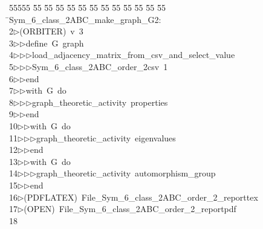 %
%
\begin{tabbing}
55555 \= 55 \= 55 \= 55 \= 55 \= 55 \= 55 \= 55 \= 55 \= 55 \= 55 \= 55 \= 55 \= \>Sym\_6\_class\_2ABC\_make\_graph\_G2:\\[0pt]
2\>$\triangleright$\>(ORBITER)\ v\ 3\ \\[0pt]
3\>$\triangleright$\>$\triangleright$\>define\ G\ graph\ \\[0pt]
4\>$\triangleright$\>$\triangleright$\>$\triangleright$\>load\_adjacency\_matrix\_from\_csv\_and\_select\_value\ \\[0pt]
5\>$\triangleright$\>$\triangleright$\>$\triangleright$\>Sym\_6\_class\_2ABC\_order\_2csv\ 1\ \\[0pt]
6\>$\triangleright$\>$\triangleright$\>end\ \\[0pt]
7\>$\triangleright$\>$\triangleright$\>with\ G\ do\ \\[0pt]
8\>$\triangleright$\>$\triangleright$\>$\triangleright$\>graph\_theoretic\_activity\ properties\ \\[0pt]
9\>$\triangleright$\>$\triangleright$\>end\ \\[0pt]
10\>$\triangleright$\>$\triangleright$\>with\ G\ do\ \\[0pt]
11\>$\triangleright$\>$\triangleright$\>$\triangleright$\>graph\_theoretic\_activity\ eigenvalues\ \\[0pt]
12\>$\triangleright$\>$\triangleright$\>end\ \\[0pt]
13\>$\triangleright$\>$\triangleright$\>with\ G\ do\ \\[0pt]
14\>$\triangleright$\>$\triangleright$\>$\triangleright$\>graph\_theoretic\_activity\ automorphism\_group\ \\[0pt]
15\>$\triangleright$\>$\triangleright$\>end\\[0pt]
16\>$\triangleright$\>(PDFLATEX)\ File\_Sym\_6\_class\_2ABC\_order\_2\_reporttex\\[0pt]
17\>$\triangleright$\>(OPEN)\ File\_Sym\_6\_class\_2ABC\_order\_2\_reportpdf\\[0pt]
18\>\end{tabbing}

